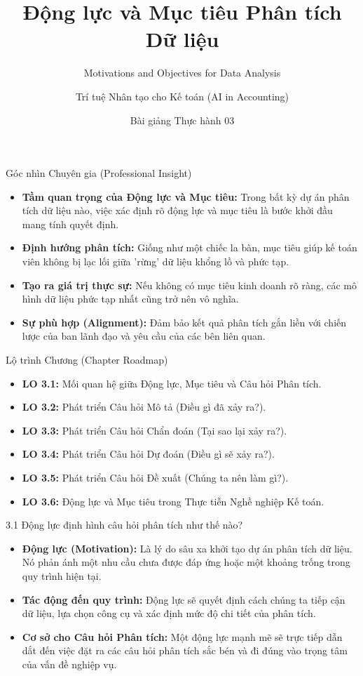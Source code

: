 \documentclass[aspectratio=169,12pt]{beamer}
\title[Thực hành - Chương 03]{Động lực và Mục tiêu Phân tích Dữ liệu}
\subtitle{Motivations and Objectives for Data Analysis}
\author[Giảng viên]{Trí tuệ Nhân tạo cho Kế toán (AI in Accounting)}
\institute[Đại học]{Khoa Kế toán - Kiểm toán}
\date{Bài giảng Thực hành 03}
\begin{document}
\begin{frame}
    \titlepage
\end{frame}

\begin{frame}{Góc nhìn Chuyên gia (Professional Insight)}
\begin{itemize}
    \item \textbf{Tầm quan trọng của Động lực và Mục tiêu:} Trong bất kỳ dự án phân tích dữ liệu nào, việc xác định rõ động lực và mục tiêu là bước khởi đầu mang tính quyết định.
    \item \textbf{Định hướng phân tích:} Giống như một chiếc la bàn, mục tiêu giúp kế toán viên không bị lạc lối giữa 'rừng' dữ liệu khổng lồ và phức tạp.
    \item \textbf{Tạo ra giá trị thực sự:} Nếu không có mục tiêu kinh doanh rõ ràng, các mô hình dữ liệu phức tạp nhất cũng trở nên vô nghĩa.
    \item \textbf{Sự phù hợp (Alignment):} Đảm bảo kết quả phân tích gắn liền với chiến lược của ban lãnh đạo và yêu cầu của các bên liên quan.
\end{itemize}
\end{frame}

\begin{frame}{Lộ trình Chương (Chapter Roadmap)}
\begin{itemize}
    \item \textbf{LO 3.1:} Mối quan hệ giữa Động lực, Mục tiêu và Câu hỏi Phân tích.
    \item \textbf{LO 3.2:} Phát triển Câu hỏi Mô tả (Điều gì đã xảy ra?).
    \item \textbf{LO 3.3:} Phát triển Câu hỏi Chẩn đoán (Tại sao lại xảy ra?).
    \item \textbf{LO 3.4:} Phát triển Câu hỏi Dự đoán (Điều gì sẽ xảy ra?).
    \item \textbf{LO 3.5:} Phát triển Câu hỏi Đề xuất (Chúng ta nên làm gì?).
    \item \textbf{LO 3.6:} Động lực và Mục tiêu trong Thực tiễn Nghề nghiệp Kế toán.
\end{itemize}
\end{frame}

\begin{frame}{3.1 Động lực định hình câu hỏi phân tích như thế nào?}
\begin{itemize}
    \item \textbf{Động lực (Motivation):} Là lý do sâu xa khởi tạo dự án phân tích dữ liệu. Nó phản ánh một nhu cầu chưa được đáp ứng hoặc một khoảng trống trong quy trình hiện tại.
    \item \textbf{Tác động đến quy trình:} Động lực sẽ quyết định cách chúng ta tiếp cận dữ liệu, lựa chọn công cụ và xác định mức độ chi tiết của phân tích.
    \item \textbf{Cơ sở cho Câu hỏi Phân tích:} Một động lực mạnh mẽ sẽ trực tiếp dẫn dắt đến việc đặt ra các câu hỏi phân tích sắc bén và đi đúng vào trọng tâm của vấn đề nghiệp vụ.
\end{itemize}
\end{frame}
\end{document}
